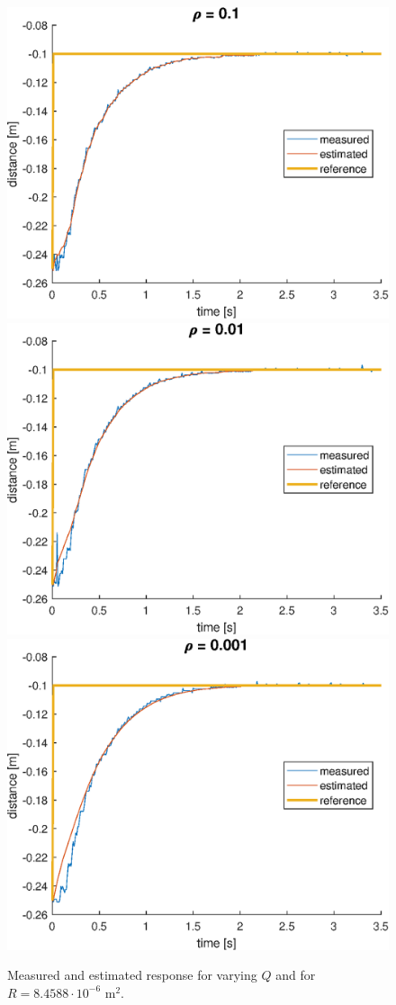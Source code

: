 \documentclass[a4paper,kul]{kulakarticle} %
\begin{document}
\begin{figure}[htp!]
	\centering
	\includegraphics[width =0.45\linewidth]{wrong_pos_01.eps}\quad
	\includegraphics[width =0.45\linewidth]{wrong_pos_001}
	\includegraphics[width =0.45\linewidth]{wrong_pos_0001.eps}
	\caption{Measured and estimated response for varying $Q$ and for $R = 8.4588\cdot10^{-6}$ m$^2$.}
	\label{fig:wrong_pos}
\end{figure}

\newpage
\end{document}
